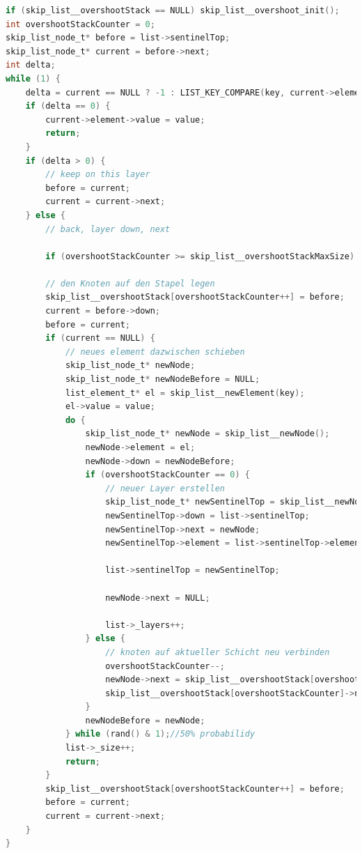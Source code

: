 \documentclass{TUBAFarbeiten}
\begin{document}
\begin{lstlisting}[language=C, frame=single, style=customc]
if (skip_list__overshootStack == NULL) skip_list__overshoot_init();
int overshootStackCounter = 0;
skip_list_node_t* before = list->sentinelTop;
skip_list_node_t* current = before->next;
int delta;
while (1) {
    delta = current == NULL ? -1 : LIST_KEY_COMPARE(key, current->element->key);
    if (delta == 0) {
        current->element->value = value;
        return;
    }
    if (delta > 0) {
        // keep on this layer
        before = current;
        current = current->next;
    } else {
        // back, layer down, next
        
        if (overshootStackCounter >= skip_list__overshootStackMaxSize) skip_list__overshoot_larger();
        
		// den Knoten auf den Stapel legen
        skip_list__overshootStack[overshootStackCounter++] = before;
        current = before->down;
        before = current;
        if (current == NULL) {
            // neues element dazwischen schieben
            skip_list_node_t* newNode;
            skip_list_node_t* newNodeBefore = NULL;
            list_element_t* el = skip_list__newElement(key);
            el->value = value;
            do {
                skip_list_node_t* newNode = skip_list__newNode();
                newNode->element = el;
                newNode->down = newNodeBefore;
                if (overshootStackCounter == 0) {
                    // neuer Layer erstellen
                    skip_list_node_t* newSentinelTop = skip_list__newNode();
                    newSentinelTop->down = list->sentinelTop;
                    newSentinelTop->next = newNode;
                    newSentinelTop->element = list->sentinelTop->element;
                    
                    list->sentinelTop = newSentinelTop;
                    
                    newNode->next = NULL;
                    
                    list->_layers++;
                } else {
                    // knoten auf aktueller Schicht neu verbinden
                    overshootStackCounter--;
                    newNode->next = skip_list__overshootStack[overshootStackCounter]->next;
                    skip_list__overshootStack[overshootStackCounter]->next = newNode;
                }
                newNodeBefore = newNode;
            } while (rand() & 1);//50% probabilidy
            list->_size++;
            return;
        }
        skip_list__overshootStack[overshootStackCounter++] = before;
        before = current;
        current = current->next;
    }
}
\end{lstlisting}
\end{document}
